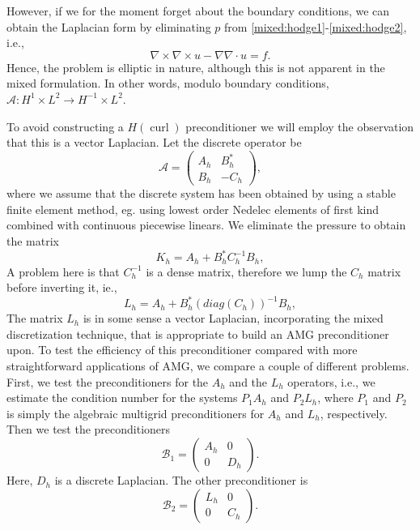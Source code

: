 However, if we for the moment forget about the boundary conditions, 
we can obtain the Laplacian form  by eliminating $p$ 
from \eqref{mixed:hodge1}-\eqref{mixed:hodge2}, i.e.,    
\[
\nabla \times \nabla \times u - \nabla \nabla \cdot u = f .  
\]
Hence, the problem is elliptic
in nature, although this is not apparent in the mixed formulation. 
In other words, modulo boundary conditions,  $\mathcal{A}: H^1 \times L^2 \rightarrow  H^{-1} \times L^2$.

To avoid constructing a $H(\operatorname{curl})$ preconditioner we will employ
the observation that this is a vector Laplacian. 
Let the discrete operator be 
\[
\mathcal{A}  =
\begin{pmatrix} A_h & B_h^* \\ B_h & -C_h \end{pmatrix}, 
\]
where we assume that the discrete system has been obtained by using a stable finite
element method, eg. using lowest order Nedelec elements of first kind~\cite{Nedelec:1980:MFE} combined with continuous piecewise linears.
We eliminate the pressure to obtain the matrix 
\[
K_h  = A_h +  B_h^* C^{-1}_h B_h, 
\]
A problem here is that $C^{-1}_h$ is a dense matrix, therefore we lump the $C_h$ matrix before inverting it, ie.,   
\[
L_h  = A_h +  B_h^* (diag(C_h))^{-1} B_h, 
\]
The matrix $L_h$ is in some sense a vector Laplacian, incorporating the mixed discretization technique, that is appropriate to build an AMG preconditioner upon. 
To test the efficiency of this preconditioner compared with 
more straightforward applications of AMG, we compare a couple of different problems.   
First, we test the preconditioners for the $A_h$ and the $L_h$ operators, 
i.e., we estimate the condition number for the systems 
$P_1 A_h$ and $P_2 L_h$, where $P_1$ and $P_2$ is simply the algebraic multigrid 
preconditioners for $A_h$ and $L_h$, respectively. 
Then we test the preconditioners 
\[
\mathcal{B}_1  =
\begin{pmatrix} A_h & 0  \\ 0  & D_h \end{pmatrix}. 
\]
Here, $D_h$ is a discrete Laplacian. The other preconditioner is   
\[
\mathcal{B}_2  =
\begin{pmatrix} L_h & 0  \\ 0  & C_h \end{pmatrix}. 
\]

